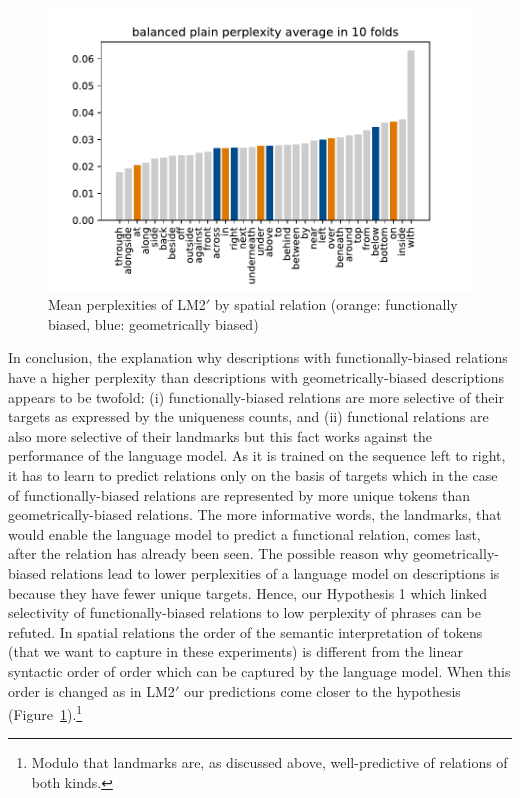 \begin{figure}[htbp]
  \begin{center}
  \includegraphics[width=0.6\linewidth]{studies/splu2018/figures/b_pp_cv-reversed-avg.pdf}
  \caption{Mean perplexities of LM2$'$ by spatial relation (orange: functionally biased, blue: geometrically biased)}\label{splu2018:fig:b_pp_cv-reversed-avg}
\end{center}
\end{figure}


In conclusion, the explanation why descriptions with
functionally-biased relations have a higher perplexity than
descriptions with geometrically-biased descriptions appears to be
twofold: (i) functionally-biased relations are more selective of their
targets as expressed by the uniqueness counts, and (ii) functional
relations are also more selective of their landmarks but this fact
works against the performance of the language model. As it is trained
on the sequence left to right, it has to learn to predict relations
only on the basis of targets which in the case of functionally-biased
relations are represented by more unique tokens than
geometrically-biased relations. The more informative words, the
landmarks, that would enable the language model to predict a
functional relation, comes last, after the relation has already been
seen. The possible reason why geometrically-biased relations lead to
lower perplexities of a language model on descriptions is because they
have fewer unique targets. Hence, our Hypothesis 1 which linked
selectivity of functionally-biased relations to low perplexity of
phrases can be refuted. In spatial relations the order of the semantic
interpretation of tokens (that we want to capture in these
experiments) is different from the linear syntactic order of order
which can be captured by the language model. When this order is
changed as in LM2$'$ our predictions come closer to the hypothesis
(Figure~\ref{splu2018:fig:b_pp_cv-reversed-avg}).\footnote{Modulo that
  landmarks are, as discussed above, well-predictive of relations of
  both kinds.} %







